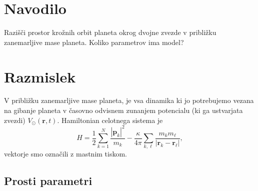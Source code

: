 \documentclass[12pt, a4paper]{article}
\renewcommand{\r}{
    \ensuremath{\mathbf{r}}
}
\newcommand{\p}{
    \ensuremath{\mathbf{p}}
}
\begin{document}
\section{Navodilo}

Razi\v s\v ci prostor kro\v znih orbit planeta okrog dvojne zvezde v pribli\v zku zanemarljive mase
planeta. Koliko parametrov ima model?

\section{Razmislek}

V pribli\v zku zanemarljive mase planeta, je vsa dinamika ki jo potrebujemo vezana na gibanje planeta
v \v casovno odvisnem zunanjem potencialu (ki ga ustvarjata zvezdi) $V_\odot(\r, t)$. Hamiltonian celotnega
sistema je
\begin{equation}
    H = \frac{1}{2}\sum_{k = 1}^N \frac{|\p_k|^2}{m_k} - \frac{\kappa}{4\pi}\sum_{k,\ell}
        \frac{m_k m_\ell}{|\r_k - \r_\ell|},
    \label{hamilton}
\end{equation}
vektorje smo ozna\v cili z mastnim tiskom.

\subsection{Prosti parametri}
\end{document}

